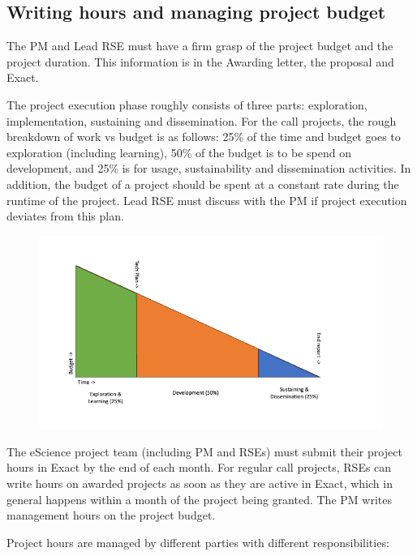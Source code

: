\documentclass[11pt]{article}
\begin{document}
\subsection{Writing hours and managing project budget}
\label{sec:exec:budget}
The PM and Lead RSE must have a firm grasp of the project budget and the project duration. This information is in the
Awarding letter, the proposal and Exact.

The project execution phase roughly consists of three parts: exploration, implementation, sustaining and dissemination.
For the call projects, the rough breakdown of work vs budget is as follows: 25\% of the time and budget goes to
exploration (including learning), 50\% of the budget is to be spend on development, and 25\% is for usage,
sustainability and dissemination activities. In addition, the budget of a project should be spent at a constant rate
during the runtime of the project. Lead RSE must discuss with the PM if project execution deviates from this plan.

\begin{figure}[!h]
    \centering
    \includegraphics[scale=0.45]{img/budget-stages.png}
\end{figure}

The eScience project team (including PM and RSEs) must submit their project hours in Exact by the end of each month. For
regular call projects, RSEs can write hours on awarded projects as soon as they are active in Exact, which in general
happens within a month of the project being granted. The PM writes management hours on the project budget.

Project hours are managed by different parties with different responsibilities:



\end{document}
